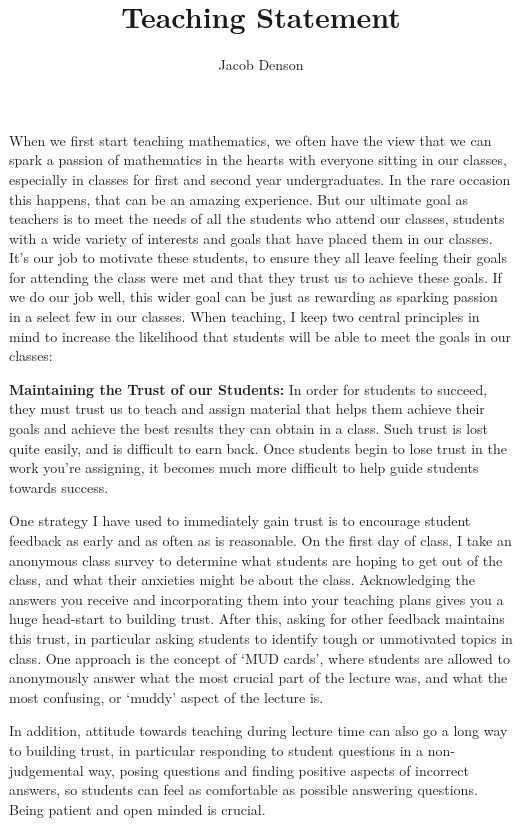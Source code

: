 \documentclass[11pt]{article}
\title{Teaching Statement}
\author{Jacob Denson}
\date{}
\begin{document}
\maketitle

When we first start teaching mathematics, we often have the view that we can spark a passion of mathematics in the hearts with everyone sitting in our classes, especially in classes for first and second year undergraduates. In the rare occasion this happens, that can be an amazing experience. But our ultimate goal as teachers is to meet the needs of all the students who attend our classes, students with a wide variety of interests and goals that have placed them in our classes. It's our job to motivate these students, to ensure they all leave feeling their goals for attending the class were met and that they trust us to achieve these goals. If we do our job well, this wider goal can be just as rewarding as sparking passion in a select few in our classes. When teaching, I keep two central principles in mind to increase the likelihood that students will be able to meet the goals in our classes:

{\bf Maintaining the Trust of our Students:} In order for students to succeed, they must trust us to teach and assign material that helps them achieve their goals and achieve the best results they can obtain in a class. Such trust is lost quite easily, and is difficult to earn back. Once students begin to lose trust in the work you're assigning, it becomes much more difficult to help guide students towards success.

One strategy I have used to immediately gain trust is to encourage student feedback as early and as often as is reasonable. On the first day of class, I take an anonymous class survey to determine what students are hoping to get out of the class, and what their anxieties might be about the class. Acknowledging the answers you receive and incorporating them into your teaching plans gives you a huge head-start to building trust. After this, asking for other feedback maintains this trust, in particular asking students to identify tough or unmotivated topics in class. One approach is the concept of `MUD cards', where students are allowed to anonymously answer what the most crucial part of the lecture was, and what the most confusing, or `muddy' aspect of the lecture is.

In addition, attitude towards teaching during lecture time can also go a long way to building trust, in particular responding to student questions in a non-judgemental way, posing questions and finding positive aspects of incorrect answers, so students can feel as comfortable as possible answering questions. Being patient and open minded is crucial.
\end{document}
